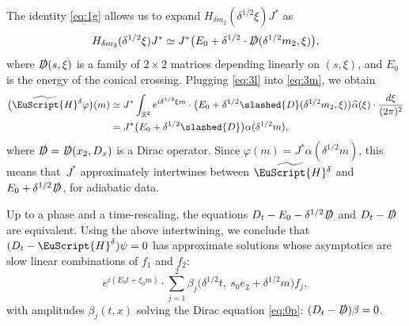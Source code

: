 \documentclass[10pt]{amsart}
\let\pazocal\EuScript
\theoremstyle{definition}
\newcommand{\HH}{\pazocal{H}}
\newcommand{\tHH}{\widetilde{\HH}{}}
\newcommand{\R}{\mathbb{R}}
\let\az\alpha
\let\vp\varphi
\newcommand{\haz}{{\widehat{\az}}}
\newcommand{\Di}{\slashed{D}}
\begin{document}
The identity \eqref{eq:1g} allows us to expand $H_{\delta m_2}(\delta^{1/2} \xi) J^*$ as
\begin{equation}\label{eq:3l}
H_{\delta m_2}(\delta^{1/2} \xi) J^* \simeq J^* \bigl( E_0 + \delta^{1/2} \cdot \Di(\delta^{1/2} m_2, \xi) \bigr),
\end{equation}
where $\Di(s,\xi)$ is a family of $2 \times 2$ matrices depending linearly on $(s,\xi)$, and $E_0$ is the energy of the conical crossing. Plugging \eqref{eq:3l} into \eqref{eq:3m}, we obtain
\begin{align*}
\bigl(\tHH^\delta \vp \bigr)(m) &\simeq J^*\int_{\R^2} e^{i\delta^{1/2} \xi m} \cdot \bigl( E_0 + \delta^{1/2} \Di(\delta^{1/2} m_2, \xi) \bigr) \haz(\xi) \cdot \dfrac{d\xi}{(2\pi )^2}\\
&= J^* \bigl( E_0 + \delta^{1/2} \Di\bigr) \az (\delta^{1/2} m),
\end{align*}
where $\Di = \Di(x_2, D_x)$ is a Dirac operator. Since $\vp(m) = J^*\az(\delta^{1/2}m)$, this means that~$J^*$ approximately intertwines between $\tHH^\delta$ and $E_0 + \delta^{1/2} \Di$, for adiabatic data.

Up to a phase and a time-rescaling, the equations $D_t - E_0 - \delta^{1/2} \Di$ and $D_t - \Di$ are equivalent. Using the above intertwining, we conclude that
$(D_t-\HH^\delta) \psi = 0$ has approximate solutions whose asymptotics are slow linear combinations of $f_1$ and $f_2$:
\begin{equation*}
e^{i(E_0 t + \xi_0 m)} \cdot \sum_{j=1}^2 \beta_j\bigl( \delta^{1/2} t, \ s_0 e_2 + \delta^{1/2} m \bigr) f_j,
\end{equation*}
with amplitudes $\beta_j(t,x)$ solving the Dirac equation \eqref{eq:0p}: $(D_t - \Di) \beta = 0$.
\end{document}
